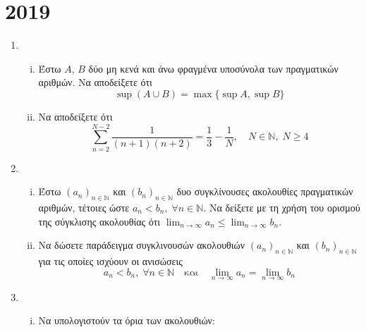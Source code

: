 \documentclass[a4paper,table]{report}
\begin{document}
\begin{center}
  \minibox{\large \bfseries \textcolor{Col1}{Θέματα Απειροστικός Ι}}
\end{center}

\vspace{\baselineskip}

\section*{2019}

\begin{enumerate}
    \item 
        \begin{enumerate}[i)]
            \item Έστω $A$, $B$ δύο μη κενά και άνω φραγμένα υποσύνολα των 
                πραγματικών αριθμών.  Να αποδείξετε ότι 
                \[
                    \sup (A \cup B) = \max \{ \sup A, \sup B \} 
                \] 
            \item Να αποδείξετε ότι 
                \[
                    \sum_{n=2}^{N-2} \frac{1}{(n+1)(n+2)} = \frac{1}{3} - \frac{1}{N}, 
                    \quad N \in \mathbb{N}, \; N \geq 4
                \] 
        \end{enumerate}

    \item 
        \begin{enumerate}[i)]
            \item Έστω $ {(a_{n})}_{n \in \mathbb{N}} $ και 
                $ {(b_{n})}_{n \in \mathbb{N}} $ δυο συγκλίνουσες ακολουθίες 
                πραγματικών αριθμών, τέτοιες ώστε $ a_{n} < b_{n}, \; \forall n 
                \in \mathbb{N} $. Να δείξετε με τη χρήση του 
                ορισμού της σύγκλισης ακολουθίας ότι $ \lim_{n \to \infty} a_{n} 
                \leq \lim_{n \to \infty} b_{n}$.

            \item Να δώσετε παράδειγμα συγκλινουσών ακολουθιών 
                $ {(a_{n})}_{n \in \mathbb{N}} $ και
                $ {(b_{n})}_{n \in \mathbb{N}} $ για τις οποίες ισχύουν οι 
                ανισώσεις 
                \[
                    a_{n} < b_{n}, \; \forall n \in \mathbb{N} \quad \text{και} \quad 
                    \lim_{n \to \infty} a_{n} = \lim_{n \to \infty} b_{n}
                \] 
        \end{enumerate}

    \item 
        \begin{enumerate}[i)]
            \item Να υπολογιστούν τα όρια των ακολουθιών:


\end{enumerate}
\end{enumerate}
\end{document}

